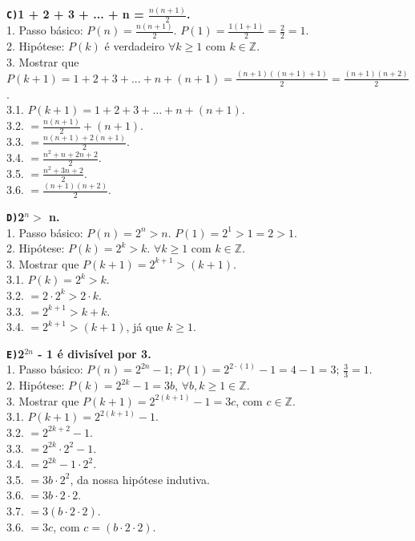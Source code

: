 \documentclass[12pt, a4paper]{article}
\newcommand{\Z}{\mathbb{Z}}
\newcommand\tab[1][1cm]{\hspace*{#1}}
\begin{document}
\begin{flushleft}
\vskip10mm

\textbf{\textbf{\texttt{C)}}1 + 2 + 3 + ... + n = $\frac{n(n+1)}{2}$.\\}
\textsf{1. Passo básico: $P(n) = \frac{n(n+1)}{2}$. $P(1) = \frac{1(1+1)}{2} = \frac{2}{2} = 1$.
\\2. Hipótese: $P(k)$ é verdadeiro $ \forall k \geq 1 $ com $k \in \Z$.
\\3. Mostrar que $P(k+1) = 1+2+3+...+n+(n+1) = \frac{(n+1)((n+1)+1)}{2} = \boxed{\frac{(n+1)(n+2)}{2}}$.
\\3.1. $P(k+1) = 1+2+3+...+n+(n+1)$.
\\3.2.\tab \tab[0.75cm] $= \frac{n(n+1)}{2}+(n+1)$.
\\3.3.\tab \tab[0.75cm] $= \frac{n(n+1) + 2(n+1)}{2}$.
\\3.4.\tab \tab[0.75cm] $= \frac{n^2+n + 2n + 2}{2}$.
\\3.5.\tab \tab[0.75cm] $= \frac{n^2+3n + 2}{2}$.
\\3.6.\tab \tab[0.75cm] $= \boxed{\frac{(n+1)(n+2)}{2}}$.}

\vskip10mm

\textbf{\textbf{\texttt{D)}}2$^n >$ n.\\}
\textsf{1. Passo básico: $P(n) = 2^n > n$. $P(1) = 2^1 > 1 = 2 > 1$.
\\2. Hipótese: $P(k) = 2^k > k$. $ \forall k \geq 1 $ com $k \in \Z$.
\\3. Mostrar que $P(k+1) = \boxed{2^{k+1} > (k+1)}$.
\\3.1. $P(k) = 2^k > k$.
\\3.2. \tab[0.855cm] $= 2 \cdot 2^k > 2 \cdot k$.
\\3.3. \tab[0.855cm] $= 2^{k+1} > k+k $.
\\3.4. \tab[0.855cm] $= \boxed{2^{k+1} > (k+1)} $, já que $k \geq 1$.}

\pagebreak

\textbf{\textbf{\texttt{E)}}2$^{2n}$ - 1 é divisível por 3.\\}
\textsf{1. Passo básico: $P(n) = 2^{2n} -1$; $P(1) = 2^{2\cdot(1)} -1 = 4 - 1 = 3$; $\frac{3}{3} = 1$.
\\2. Hipótese: $P(k) = 2^{2k} -1 = 3b$, $ \forall b,k \geq 1 \in \Z$.
\\3. Mostrar que $P(k+1) = 2^{2(k+1)} - 1 = \boxed{3c}$, com $c \in \Z$.
\\3.1. $P(k+1) = 2^{2(k+1)} - 1$.
\\3.2.\tab \tab[0.75cm] $= 2^{2k + 2} - 1$.
\\3.3.\tab \tab[0.75cm] $= 2^{2k} \cdot 2^{2} - 1$.
\\3.4.\tab \tab[0.75cm] $= 2^{2k}  - 1 \cdot 2^{2}$.
\\3.5.\tab \tab[0.75cm] $= 3b \cdot 2^{2}$, da nossa hipótese indutiva.
\\3.6.\tab \tab[0.75cm] $= 3b \cdot 2 \cdot 2$.
\\3.7.\tab \tab[0.75cm] $= 3(b \cdot 2 \cdot 2)$.
\\3.6.\tab \tab[0.75cm] $= \boxed{3c}$, com $c = (b \cdot 2 \cdot 2)$.}


\end{flushleft}
\end{document}
